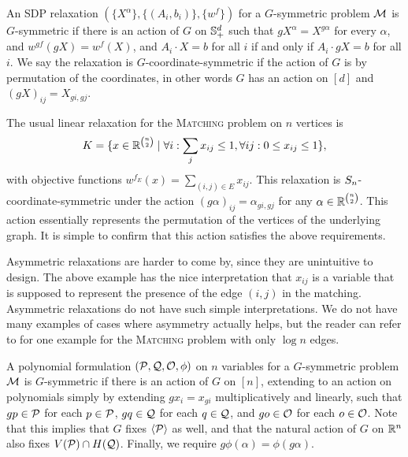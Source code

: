 \begin{definition}
An SDP relaxation $(\{X^\alpha\},\{(A_i,b_i)\},\{w^f\})$ for a $G$-symmetric problem $\mathcal M$ is $G$-symmetric if there is an action of $G$ on $\mathbb{S}^{d}_+$ such that $gX^\alpha = X^{g\alpha}$ for every $\alpha$, and $w^{gf}(gX) = w^f(X)$, and $A_i \cdot X = b$ for all $i$ if and only if $A_i \cdot gX = b$ for all $i$. We say the relaxation is $G$-coordinate-symmetric if the action of $G$ is by permutation of the coordinates, in other words $G$ has an action on $[d]$ and $(gX)_{ij} = X_{gi,gj}$.
\end{definition}
\begin{example}
The usual linear relaxation for the \textsc{Matching} problem on $n$ vertices is
\[K = \{x \in \mathbb R^{\binom{n}{2}} \mid \forall i: \sum_j x_{ij} \leq 1, \forall ij: 0 \leq x_{ij} \leq 1\},\]
with objective functions $w^{f_E}(x) = \sum_{(i,j) \in E} x_{ij}$. This relaxation is $S_{n}$-coordinate-symmetric under the action $(g\alpha)_{ij} = \alpha_{gi,gj}$ for any $\alpha \in \mathbb R^{\binom{n}{2}}$. This action essentially represents the permutation of the vertices of the underlying graph. It is simple to confirm that this action satisfies the above requirements. 
\end{example}
Asymmetric relaxations are harder to come by, since they are unintuitive to design. The above example has the nice interpretation that $x_{ij}$ is a variable that is supposed to represent the presence of the edge $(i,j)$ in the matching. Asymmetric relaxations do not have such simple interpretations. We do not have many examples of cases where asymmetry actually helps, but the reader can refer to \cite{KPT10} for one example for the \textsc{Matching} problem with only $\log n$ edges.

\begin{definition}
A polynomial formulation $(\mathcal P,\mathcal Q,\mathcal O,\phi)$ on $n$ variables for a $G$-symmetric problem $\mathcal M$ is $G$-symmetric if there is an action of $G$ on $[n]$, extending to an action on polynomials simply by extending $gx_i = x_{gi}$ multiplicatively and linearly, such that $gp \in \mathcal P$ for each $p \in \mathcal P$, $gq \in \mathcal Q$ for each $q \in \mathcal Q$, and $go \in \mathcal O$ for each $o \in \mathcal O$. Note that this implies that $G$ fixes $\langle \mathcal P \rangle$ as well, and that the natural action of $G$ on $\mathbb R^n$ also fixes $V(\mathcal P) \cap H(\mathcal Q)$. Finally, we require $g\phi(\alpha) = \phi(g\alpha)$.
\end{definition}

